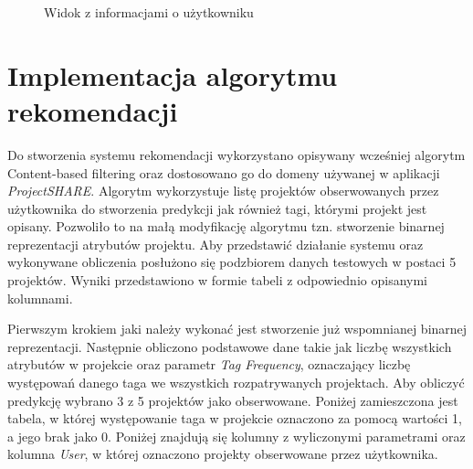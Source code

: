 \begin{figure}[h!]
	\caption{Widok z informacjami o użytkowniku}
	\centering
\end{figure}

\clearpage

\section{Implementacja algorytmu rekomendacji}

Do stworzenia systemu rekomendacji wykorzystano opisywany wcześniej algorytm Content-based filtering oraz dostosowano go do domeny używanej w aplikacji  \mbox{\textit{ProjectSHARE}}. Algorytm wykorzystuje listę projektów obserwowanych przez użytkownika do stworzenia predykcji jak również tagi, którymi projekt jest opisany. Pozwoliło to na małą modyfikację algorytmu tzn. stworzenie binarnej reprezentacji atrybutów projektu\cite{REC02}. Aby przedstawić działanie systemu oraz wykonywane obliczenia posłużono się podzbiorem danych testowych w postaci 5 projektów. Wyniki przedstawiono w formie tabeli z odpowiednio opisanymi kolumnami.

Pierwszym krokiem jaki należy wykonać jest stworzenie już wspomnianej binarnej reprezentacji. Następnie obliczono podstawowe dane takie jak liczbę wszystkich atrybutów w projekcie oraz parametr \textit{Tag Frequency}, oznaczający liczbę występowań danego taga we wszystkich rozpatrywanych projektach. Aby obliczyć predykcję wybrano 3 z 5 projektów jako obserwowane. Poniżej zamieszczona jest tabela, w której występowanie taga w projekcie oznaczono za pomocą wartości 1, a jego brak jako 0. Poniżej znajdują się kolumny z wyliczonymi parametrami oraz kolumna \textit{User}, w której oznaczono projekty obserwowane przez użytkownika.   

